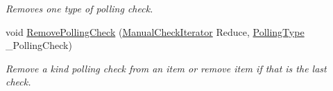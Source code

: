 \begin{DoxyCompactItemize}
\begin{DoxyCompactList}\small\item\em Removes one type of polling check. \item\end{DoxyCompactList}\item 
void \hyperlink{structMezzanine_1_1internal_1_1EventManagerInternalData_a031eec688cb8a7381f958772441af3a9}{RemovePollingCheck} (\hyperlink{structMezzanine_1_1internal_1_1EventManagerInternalData_a0e7ecff8902c7881b006e63584f639b4}{ManualCheckIterator} Reduce, \hyperlink{structMezzanine_1_1internal_1_1EventManagerInternalData_a4179a167c7f67babd5aa4902dc279027}{PollingType} \_\-PollingCheck)
\begin{DoxyCompactList}\small\item\em Remove a kind polling check from an item or remove item if that is the last check. \item\end{DoxyCompactList}\end{DoxyCompactItemize}
